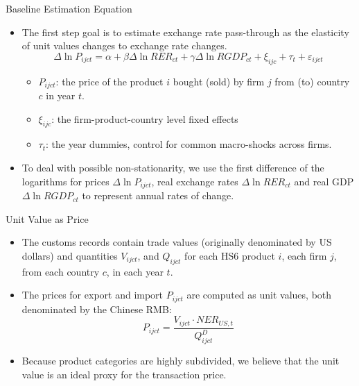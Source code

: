 \documentclass[10pt]{beamer}
\begin{document}
\begin{frame}{Baseline Estimation Equation}
	\begin{itemize}
		\item The first step goal is to estimate exchange rate pass-through as the elasticity of unit values changes to exchange rate changes.
		\begin{equation}
			\Delta \ln P_{i j c t}=\alpha+\beta \Delta \ln R E R_{c t}+\gamma \Delta \ln R G D P_{c t}+\xi_{i j c}+\tau_{t}+\varepsilon_{i j c t}
			\label{eq4.1}
		\end{equation}
            \begin{itemize}
                \item $P_{ijct}$: the price of the product $i$ bought (sold) by firm $j$ from (to) country $c$ in year $t$.
                \item $\xi_{ijc}$: the firm-product-country level fixed effects
                \item $\tau_t$: the year dummies, control for common macro-shocks across firms.
            \end{itemize}
		\item To deal with possible non-stationarity, we use the first difference of the logarithms for prices $\Delta \ln P_{i j c t}$, real exchange rates $\Delta \ln R E R_{c t}$ and real GDP $\Delta \ln R G D P_{c t}$ to represent annual rates of change.
	\end{itemize}
\end{frame}

\begin{frame}{Unit Value as Price}
	\begin{itemize}
		\item The customs records contain trade values (originally denominated by US dollars) and quantities $V_{ijct}$, and $Q_{ijct}$ for each HS6 product $i$, each firm $j$, from each country $c$, in each year $t$.
		\item The prices for export and import $P_{i j c t}$ are computed as unit values, both denominated by the Chinese RMB:
		$$
		P_{ijct}=\frac{V_{ijct}\cdot NER_{US,t}}{Q^{D}_{ijct}}
		$$
		\item Because product categories are highly subdivided, we believe that the unit value is an ideal proxy for the transaction price.
	\end{itemize}
\end{frame}
\end{document}
